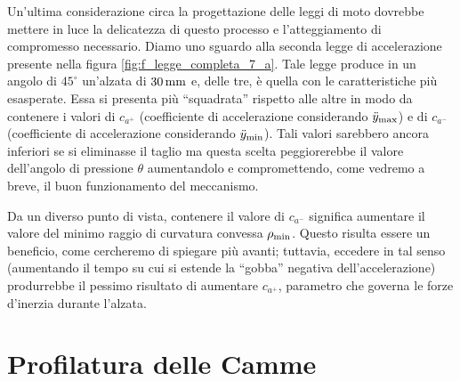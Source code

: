 \noindent Un'ultima considerazione circa la progettazione delle leggi di moto
dovrebbe mettere in luce la delicatezza di questo processo e l'atteggiamento
di compromesso necessario. Diamo uno sguardo alla seconda legge di accelerazione
presente nella figura \ref{fig:f_legge_completa_7_a}.
Tale legge produce in un angolo di $45^{\circ}$ un'alzata di $30\, {\rm mm}$ e,
delle tre, \`e quella con le caratteristiche pi\`u esasperate. Essa si presenta
pi\`u
``squadrata'' rispetto alle altre in modo da contenere i valori di $c_{a^+}$
(coefficiente di accelerazione considerando $\ddot y_{\rm max}$)
e di $c_{a^-}$
(coefficiente di accelerazione considerando $\ddot y_{\rm min}$). Tali valori sarebbero ancora inferiori se si eliminasse
il taglio ma questa scelta peggiorerebbe il valore dell'angolo di pressione 
$\theta$ aumentandolo e compromettendo, come vedremo a breve, il buon
funzionamento del meccanismo. 

\noindent Da un diverso punto di vista,
 contenere il valore di $c_{a^-}$ significa aumentare il valore del
minimo raggio di curvatura convessa $\rho_{\rm min}$.
Questo risulta essere un beneficio, come cercheremo di spiegare pi\`u avanti;
tuttavia,
eccedere in tal senso (aumentando il tempo su cui si estende la ``gobba''
negativa dell'accelerazione) produrrebbe il pessimo risultato di
aumentare $c_{a^+}$, parametro che governa
le forze d'inerzia durante l'alzata.

\vskip 1mm
\null
\section{Profilatura delle Camme}

